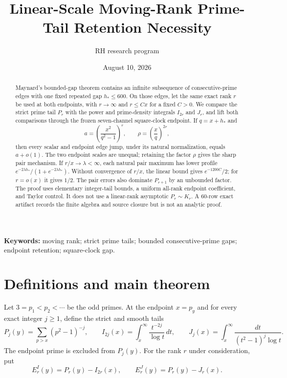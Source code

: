 \documentclass[11pt]{article}
\title{Linear-Scale Moving-Rank Prime-Tail Retention Necessity}
\author{RH research program}
\date{August 10, 2026}
\theoremstyle{definition}
\theoremstyle{remark}
\newcommand{\EI}{E^{I}}
\newcommand{\EJ}{E^{J}}
\begin{document}
\maketitle

\begin{abstract}
Maynard's bounded-gap theorem contains an infinite subsequence of
consecutive-prime edges with one fixed repeated gap $h_*\le600$.  On
those edges, let the same exact rank $r$ be used at both endpoints, with
$r\to\infty$ and $r\le Cx$ for a fixed $C>0$.  We compare the strict
prime tail $P_r$ with the power and prime-density integrals $I_{2r}$ and
$J_r$, and lift both comparisons through the frozen seven-channel
square-clock endpoint.  If $q=x+h_*$ and
\[
 a=\left(\frac{x^2}{q^2-1}\right)^r,
 \qquad \rho=\left(\frac{x}{q}\right)^{2r},
\]
then every scalar and endpoint edge jump, under its natural
normalization, equals $a+o(1)$.  The two endpoint scales are unequal;
retaining the factor $\rho$ gives the sharp pair mechanism.  If
$r/x\to\lambda<\infty$, each natural pair maximum has lower profile
$e^{-2\lambda h_*}/(1+e^{-2\lambda h_*})$.  Without convergence of
$r/x$, the linear bound gives $e^{-1200C}/2$; for $r=o(x)$ it gives
$1/2$.  The pair errors also dominate $P_{r+1}$ by an unbounded factor.
The proof uses elementary integer-tail bounds, a uniform all-rank
endpoint coefficient, and Taylor control.  It does not use a
linear-rank asymptotic $P_r\sim K_r$.  A 60-row exact artifact records
the finite algebra and source closure but is not an analytic proof.
\end{abstract}

\noindent\textbf{Keywords:} moving rank; strict prime tails; bounded
consecutive-prime gaps; endpoint retention; square-clock gap.

\section{Definitions and main theorem}

Let $3=p_1<p_2<\cdots$ be the odd primes.  At the endpoint $x=p_y$ and
for every exact integer $j\ge1$, define the strict and smooth tails
\begin{equation}
 P_j(y)=\sum_{p>x}(p^2-1)^{-j},\qquad
 I_{2j}(x)=\int_x^\infty\frac{t^{-2j}}{\log t}\,dt,
 \qquad
 J_j(x)=\int_x^\infty\frac{dt}{(t^2-1)^j\log t}.
 \label{eq:tails}
\end{equation}
The endpoint prime is excluded from $P_j(y)$.  For the rank $r$ under
consideration, put
\begin{equation}
 \EI_r(y)=P_r(y)-I_{2r}(x),\qquad
 \EJ_r(y)=P_r(y)-J_r(x).
 \label{eq:scalar-errors}
\end{equation}
\end{document}
